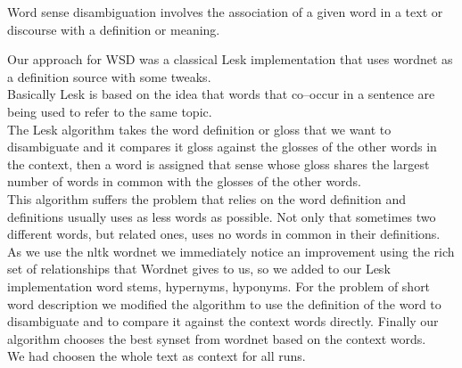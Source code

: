 Word sense disambiguation involves the association of a given word in a text or discourse with a definition or meaning.

Our approach for WSD was a classical Lesk\cite{LESK} implementation that uses wordnet as a definition source with some tweaks.\\
Basically Lesk is based on the idea that words that co–occur in a sentence are being used to refer to the same topic. \\
The Lesk algorithm takes the word definition or gloss that we want to disambiguate and it compares it gloss against the glosses of the other words in the context, then a word is assigned that sense whose gloss shares the largest number of words in common with the glosses of the other words.\\
This algorithm suffers the problem that relies on the word definition and definitions usually uses as less words as possible. Not only that sometimes two different words, but related ones, uses no words in common in their definitions. \\
As we use the nltk wordnet we immediately notice an improvement using the rich set of relationships that Wordnet gives to us, so we added to our Lesk implementation word stems, hypernyms, hyponyms.
For the problem of short word description we modified the algorithm to use the definition of the word to disambiguate and to compare it against the context words directly.
Finally our algorithm chooses the best synset from wordnet based on the context words. \\
We had choosen the whole text as context for all runs.

